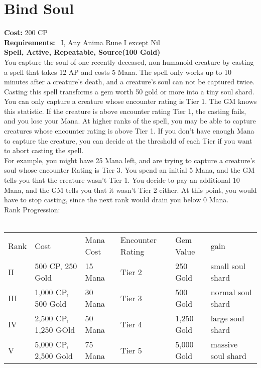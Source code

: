\section{Bind Soul}
\textbf{Cost:} 200 CP\\
\textbf{Requirements:}~ I, Any Anima Rune I except Nil\\
\textbf{Spell, Active, Repeatable, Source(100 Gold)}\\
You capture the soul of one recently deceased, non-humanoid creature by casting a spell that takes 12 AP and costs 5 Mana.
The spell only works up to 10 minutes after a creature's death, and a creature's soul can not be captured twice.
Casting this spell transforms a gem worth 50 gold or more into a tiny soul shard.\\
You can only capture a creature whose encounter rating is Tier 1.
The GM knows this statistic.
If the creature is above encounter rating Tier 1, the casting fails, and you lose your Mana.
At higher ranks of the spell, you may be able to capture creatures whose encounter rating is above Tier 1.
If you don't have enough Mana to capture the creature, you can decide at the threshold of each Tier if you want to abort casting the spell.\\
For example, you might have 25 Mana left, and are trying to capture a creature's soul whose encounter Rating is Tier 3.
You spend an initial 5 Mana, and the GM tells you that the creature wasn't Tier 1.
You decide to pay an additional 10 Mana, and the GM tells you that it wasn't Tier 2 either.
At this point, you would have to stop casting, since the next rank would drain you below 0 Mana.
\\
Rank Progression:\\
\\
\begin{longtable}{l | l | p{5.5cm} | p{2.5cm}}
    Rank & Cost & Mana Cost & Encounter Rating & Gem Value & gain\\
    II & 500 CP, 250 Gold & 15 Mana & Tier 2 & 250 Gold & small soul shard\\
    III & 1,000 CP, 500 Gold & 30 Mana & Tier 3 & 500 Gold & normal soul shard\\
    IV & 2,500 CP, 1,250 GOld & 50 Mana & Tier 4 & 1,250 Gold & large soul shard\\
    V & 5,000 CP, 2,500 Gold & 75 Mana & Tier 5 & 5,000 Gold & massive soul shard\\
\end{longtable}